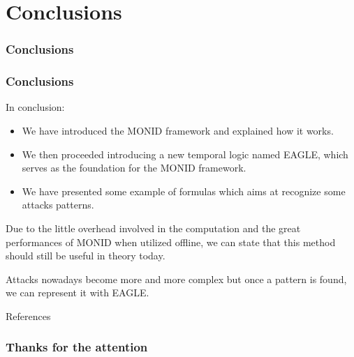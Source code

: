 \documentclass[aspectratio=169,t,xcolor=table]{beamer}
\begin{document}
\section{Conclusions}
\begin{frame}{}
    \frametitle{Conclusions}
\end{frame}


\begin{frame}
    \frametitle{Conclusions}
    In conclusion:
    \begin{itemize}
        \item We have introduced the MONID framework and explained how it works.
        \item We then proceeded introducing a new temporal logic named EAGLE, which serves as the foundation for the MONID framework.
        \item We have presented some example of formulas which aims at recognize some attacks patterns.
    \end{itemize}
    \vspace{2.5mm}
    Due to the little overhead involved in the computation and the great performances of MONID when utilized offline, we can state that this method should still be useful in theory today. 
    
    \vspace{2.5mm}
    Attacks nowadays become more and more complex but once a pattern is found, we can represent it with EAGLE.
\end{frame}

\begin{frame}[allowframebreaks]{References}
    \nocite{*} 
    \printbibliography
\end{frame}

\begin{frame}{}
    \frametitle{Thanks for the attention}
\end{frame}
\end{document}
